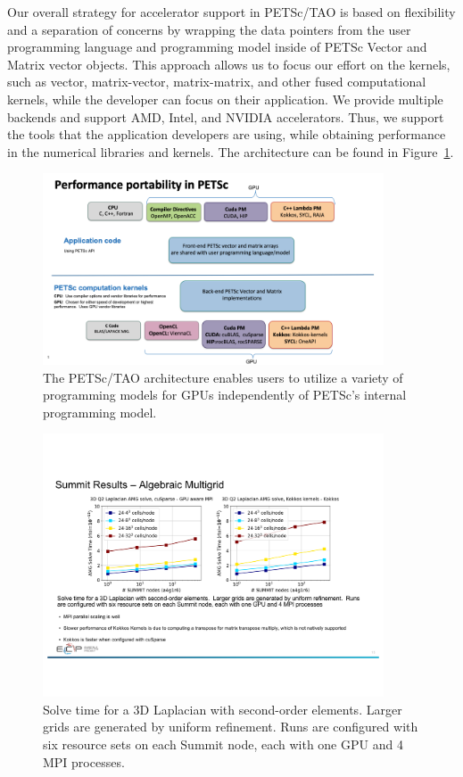 Our overall strategy for accelerator support in PETSc/TAO is based on flexibility and a separation 
of concerns by wrapping the data pointers from the user programming language and programming 
model inside of PETSc Vector and Matrix vector objects.  This approach allows us to focus 
our effort on the kernels, such as vector, matrix-vector, matrix-matrix, and other fused 
computational kernels, while the developer can focus on their application.  We provide 
multiple backends and support AMD, Intel, and NVIDIA accelerators.  Thus, we support 
the tools that the application developers are using, while obtaining performance in 
the numerical libraries and kernels.  The architecture can be found in 
Figure~\ref{fig:petsc-tao-fig}.

\begin{figure}
\centering
\includegraphics[trim = 0in .2in 1.7in .2in, clip, width=0.9\textwidth]{projects/2.3.3-MathLibs/2.3.3.06-PETSc-TAO/petsc_arch}
\caption{The PETSc/TAO architecture enables users to utilize a variety of programming
models for GPUs independently of PETSc's internal programming model.}
\label{fig:petsc-tao-fig}
\end{figure}

\begin{figure}
\centering
\includegraphics[trim = 1in 3.6in 1in 2in, clip, width=0.9\textwidth]{projects/2.3.3-MathLibs/2.3.3.06-PETSc-TAO/petsc_perf}
\caption{Solve time for a 3D Laplacian with second-order elements.  Larger grids are generated by uniform refinement.  Runs are configured with six resource sets on each Summit node, each with one GPU and 4 MPI processes.}
\label{fig:petsc-tao-perf}
\end{figure}

